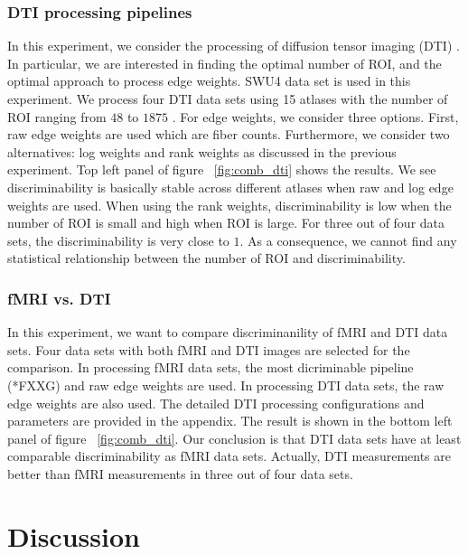 \documentclass{article}
\begin{document}
\subsubsection{DTI processing pipelines}
In this experiment, we consider the processing of diffusion tensor imaging (DTI) \cite{westin2002processing}. In particular, we are interested in finding the optimal number of ROI, and the optimal approach to process edge weights. SWU4 data set is used in this experiment. We process four DTI data sets using 15 atlases with the number of ROI ranging from $48$ to $1875$ \cite{mori2005mri}. For edge weights, we consider three options. First, raw edge weights are used which are fiber counts. Furthermore, we consider two alternatives: log weights and rank weights as discussed in the previous experiment. Top left panel of figure ~\ref{fig:comb_dti} shows the results. We see discriminability is basically stable across different atlases when raw and log edge weights are used. When using the rank weights, discriminability is low when the number of ROI is small and high when ROI is large. For three out of four data sets, the discriminability is very close to $1$. As a consequence, we cannot find any statistical relationship between the number of ROI and discriminability.




\subsubsection{fMRI vs. DTI}
In this experiment, we want to compare discriminanility of fMRI and DTI data sets. Four data sets with both fMRI and DTI images are selected for the comparison. In processing fMRI data sets, the most dicriminable pipeline (*FXXG) and raw edge weights are used. In processing DTI data sets, the raw edge weights are also used. The detailed DTI processing configurations and parameters are provided in the appendix. The result is shown in the bottom left panel of figure ~\ref{fig:comb_dti}. Our conclusion is that DTI data sets have at least comparable discriminability as fMRI data sets. Actually, DTI measurements are better than fMRI measurements in three out of four data sets. 



\section{Discussion}
\end{document}

